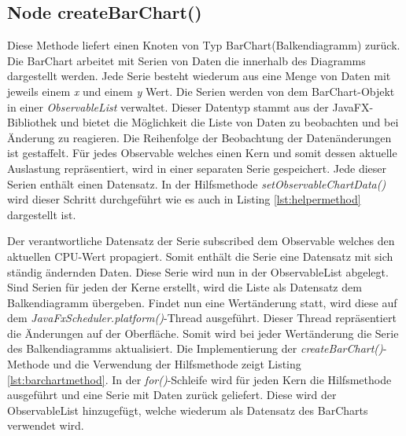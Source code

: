 \subsection{Node createBarChart()}
 
Diese Methode liefert einen Knoten von Typ BarChart(Balkendiagramm) zurück. Die BarChart arbeitet mit Serien von Daten die innerhalb des Diagramms dargestellt werden. Jede Serie besteht wiederum aus eine Menge von Daten mit jeweils einem \textit{x} und einem \textit{y} Wert. Die Serien werden von dem BarChart-Objekt in einer \textit{ObservableList} verwaltet. Dieser Datentyp stammt aus der JavaFX-Bibliothek und bietet die Möglichkeit die Liste von Daten zu beobachten und bei Änderung zu reagieren. Die Reihenfolge der Beobachtung der Datenänderungen ist gestaffelt. Für jedes Observable welches einen Kern und somit dessen aktuelle Auslastung repräsentiert, wird in einer separaten Serie gespeichert. Jede dieser Serien enthält einen Datensatz. In der Hilfsmethode \textit{setObservableChartData()} wird dieser Schritt durchgeführt wie es auch in Listing \ref{lst:helpermethod} dargestellt ist. 
 
Der verantwortliche Datensatz der Serie subscribed dem Observable welches den aktuellen CPU-Wert propagiert. Somit enthält die Serie eine Datensatz mit sich ständig ändernden Daten. Diese Serie wird nun in der ObservableList abgelegt. Sind Serien für jeden der Kerne erstellt, wird die Liste als Datensatz dem Balkendiagramm übergeben. Findet nun eine Wertänderung statt, wird diese auf dem \textit{JavaFxScheduler.platform()}-Thread ausgeführt. Dieser Thread repräsentiert die Änderungen auf der Oberfläche. Somit wird bei jeder Wertänderung die Serie des Balkendiagramms aktualisiert. Die Implementierung der \textit{createBarChart()}-Methode und die Verwendung der Hilfsmethode zeigt Listing \ref{lst:barchartmethod}. In der \textit{for()}-Schleife wird für jeden Kern die Hilfsmethode ausgeführt und eine Serie mit Daten zurück geliefert. Diese wird der ObservableList hinzugefügt, welche wiederum als Datensatz des BarCharts verwendet wird.
